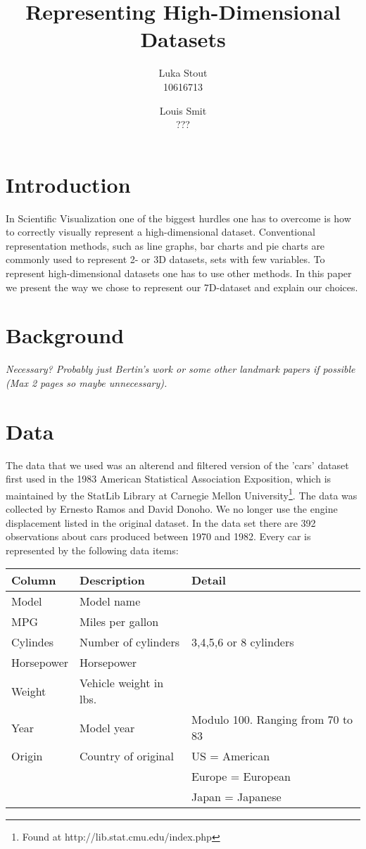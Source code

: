 \documentclass{article}
\title{Representing High-Dimensional Datasets}
\author{Luka Stout \\ 10616713  \and Louis Smit \\ ???}
\begin{document}
\maketitle

\section{Introduction}
In Scientific Visualization one of the biggest hurdles one has to overcome is how to correctly visually represent a high-dimensional dataset. Conventional representation methods, such as line graphs, bar charts and pie charts are commonly used to represent 2- or 3D 
datasets, sets with few variables. To represent high-dimensional datasets one has to use other methods. In this paper we present the way we chose to represent our 7D-dataset and explain our choices.

\section{Background}
\textit{Necessary? Probably just Bertin's work or some other landmark papers if possible (Max 2 pages so maybe unnecessary).}

\section{Data}
The data that we used was an alterend and filtered version of the 'cars' dataset first used in the 1983 American Statistical Association Exposition, which is maintained by the StatLib Library at Carnegie Mellon University\footnote{Found at http://lib.stat.cmu.edu/index.php}. The data was collected by Ernesto Ramos and David Donoho. We no longer use the engine displacement listed in the original dataset. In the data set there are 392 observations about cars produced between 1970 and 1982. Every car is represented by the following data items:
\begin{center}
	\begin{tabular}{| l | l | l |}
	\hline
	\textbf{Column} & \textbf{Description} & \textbf{Detail} \\ \hline
	Model & Model name & \\ \hline
	MPG & Miles per gallon & \\ \hline
	Cylindes & Number of cylinders & 3,4,5,6 or 8 cylinders \\ \hline
	Horsepower & Horsepower &  \\ \hline
	Weight & Vehicle weight in lbs. & \\ \hline
	Year & Model year & Modulo 100. Ranging from 70 to 83\\ \hline
	Origin & Country of original & US = American \\&& Europe = European \\ &&Japan = Japanese \\ \hline
	\end{tabular}
\end{center}
\end{document}
